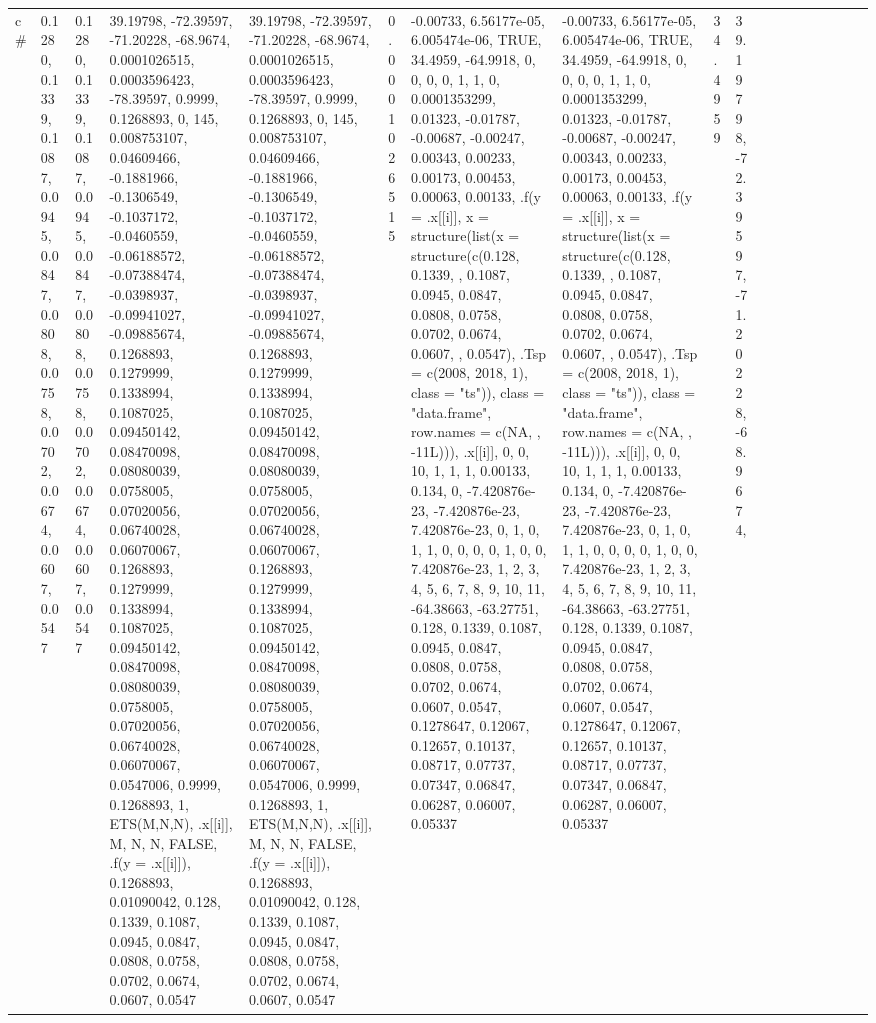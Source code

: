 \documentclass[
]{article}
\begin{document}
\begin{table}
\begin{tabular}{l|l|l|l|l|l|l|l|l|l|l|r|l|r|r|r|r|r}
c\# & 0.1280, 0.1339, 0.1087, 0.0945, 0.0847, 0.0808, 0.0758, 0.0702, 0.0674, 0.0607, 0.0547 & 0.1280, 0.1339, 0.1087, 0.0945, 0.0847, 0.0808, 0.0758, 0.0702, 0.0674, 0.0607, 0.0547 & 39.19798, -72.39597, -71.20228, -68.9674, 0.0001026515, 0.0003596423, -78.39597, 0.9999, 0.1268893, 0, 145, 0.008753107, 0.04609466, -0.1881966, -0.1306549, -0.1037172, -0.0460559, -0.06188572, -0.07388474, -0.0398937, -0.09941027, -0.09885674, 0.1268893, 0.1279999, 0.1338994, 0.1087025, 0.09450142, 0.08470098, 0.08080039, 0.0758005, 0.07020056, 0.06740028, 0.06070067, 0.1268893, 0.1279999, 0.1338994, 0.1087025, 0.09450142, 0.08470098, 0.08080039, 0.0758005, 0.07020056, 0.06740028, 0.06070067, 0.0547006, 0.9999, 0.1268893, 1, ETS(M,N,N), .x[[i]], M, N, N, FALSE, .f(y = .x[[i]]), 0.1268893, 0.01090042, 0.128, 0.1339, 0.1087, 0.0945, 0.0847, 0.0808, 0.0758, 0.0702, 0.0674, 0.0607, 0.0547 & 39.19798, -72.39597, -71.20228, -68.9674, 0.0001026515, 0.0003596423, -78.39597, 0.9999, 0.1268893, 0, 145, 0.008753107, 0.04609466, -0.1881966, -0.1306549, -0.1037172, -0.0460559, -0.06188572, -0.07388474, -0.0398937, -0.09941027, -0.09885674, 0.1268893, 0.1279999, 0.1338994, 0.1087025, 0.09450142, 0.08470098, 0.08080039, 0.0758005, 0.07020056, 0.06740028, 0.06070067, 0.1268893, 0.1279999, 0.1338994, 0.1087025, 0.09450142, 0.08470098, 0.08080039, 0.0758005, 0.07020056, 0.06740028, 0.06070067, 0.0547006, 0.9999, 0.1268893, 1, ETS(M,N,N), .x[[i]], M, N, N, FALSE, .f(y = .x[[i]]), 0.1268893, 0.01090042, 0.128, 0.1339, 0.1087, 0.0945, 0.0847, 0.0808, 0.0758, 0.0702, 0.0674, 0.0607, 0.0547 & 0.0001026515 & -0.00733, 6.56177e-05, 6.005474e-06, TRUE, 34.4959, -64.9918, 0, 0, 0, 0, 1, 1, 0, 0.0001353299, 0.01323, -0.01787, -0.00687, -0.00247, 0.00343, 0.00233, 0.00173, 0.00453, 0.00063, 0.00133, .f(y = .x[[i]], x = structure(list(x = structure(c(0.128, 0.1339, , 0.1087, 0.0945, 0.0847, 0.0808, 0.0758, 0.0702, 0.0674, 0.0607, , 0.0547), .Tsp = c(2008, 2018, 1), class = "ts")), class = "data.frame", row.names = c(NA, , -11L))), .x[[i]], 0, 0, 10, 1, 1, 1, 0.00133, 0.134, 0, -7.420876e-23, -7.420876e-23, 7.420876e-23, 0, 1, 0, 1, 1, 0, 0, 0, 0, 1, 0, 0, 7.420876e-23, 1, 2, 3, 4, 5, 6, 7, 8, 9, 10, 11, -64.38663, -63.27751, 0.128, 0.1339, 0.1087, 0.0945, 0.0847, 0.0808, 0.0758, 0.0702, 0.0674, 0.0607, 0.0547, 0.1278647, 0.12067, 0.12657, 0.10137, 0.08717, 0.07737, 0.07347, 0.06847, 0.06287, 0.06007, 0.05337 & -0.00733, 6.56177e-05, 6.005474e-06, TRUE, 34.4959, -64.9918, 0, 0, 0, 0, 1, 1, 0, 0.0001353299, 0.01323, -0.01787, -0.00687, -0.00247, 0.00343, 0.00233, 0.00173, 0.00453, 0.00063, 0.00133, .f(y = .x[[i]], x = structure(list(x = structure(c(0.128, 0.1339, , 0.1087, 0.0945, 0.0847, 0.0808, 0.0758, 0.0702, 0.0674, 0.0607, , 0.0547), .Tsp = c(2008, 2018, 1), class = "ts")), class = "data.frame", row.names = c(NA, , -11L))), .x[[i]], 0, 0, 10, 1, 1, 1, 0.00133, 0.134, 0, -7.420876e-23, -7.420876e-23, 7.420876e-23, 0, 1, 0, 1, 1, 0, 0, 0, 0, 1, 0, 0, 7.420876e-23, 1, 2, 3, 4, 5, 6, 7, 8, 9, 10, 11, -64.38663, -63.27751, 0.128, 0.1339, 0.1087, 0.0945, 0.0847, 0.0808, 0.0758, 0.0702, 0.0674, 0.0607, 0.0547, 0.1278647, 0.12067, 0.12657, 0.10137, 0.08717, 0.07737, 0.07347, 0.06847, 0.06287, 0.06007, 0.05337 & 34.4959 & 39.19798, -72.39597, -71.20228, -68.9674, 
\end{tabular}
\end{table}
\end{document}
